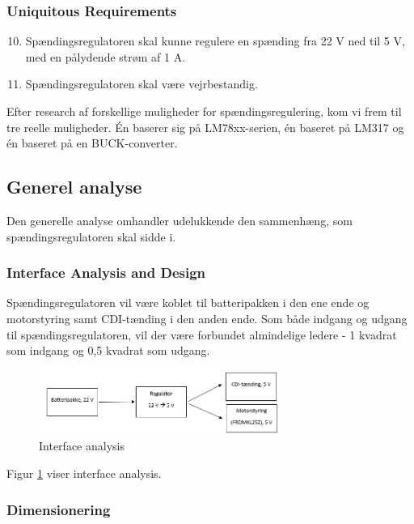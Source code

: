 \subsubsection{Uniquitous Requirements}
\label{sec:kravsspecifikation-3}

\begin{enumerate}[label=2.1.1.\arabic*]
  \setcounter{enumi}{9}
\item Spændingsregulatoren skal kunne regulere en spænding fra 22 V ned til 5 V, med en pålydende strøm af 1 A. 
\item Spændingsregulatoren skal være vejrbestandig.
\end{enumerate}

Efter research af forskellige muligheder for spændingsregulering, kom vi frem til tre reelle muligheder. Én baserer sig på LM78xx-serien, én baseret på LM317 og én baseret på en BUCK-converter.

\subsection{Generel analyse}
\label{sec:generel-analyse-}

Den generelle analyse omhandler udelukkende den sammenhæng, som spændingsregulatoren skal sidde i.

\subsubsection{Interface Analysis and Design}
\label{sec:generel-analyse}

Spændingsregulatoren vil være koblet til batteripakken i den ene ende og motorstyring samt CDI-tænding i den anden ende. Som både indgang og udgang til spændingsregulatoren, vil der være forbundet almindelige ledere - 1 kvadrat som indgang og 0,5 kvadrat som udgang.

\begin{figure}[h]
  \centering
  \includegraphics[width=0.7\textwidth]{./figurer/j1.png}
  \caption{Interface analysis}
  \label{fig:j1}
\end{figure}

Figur \ref{fig:j1} viser interface analysis.

\subsubsection{Dimensionering}
\label{sec:generel-analyse-1}

